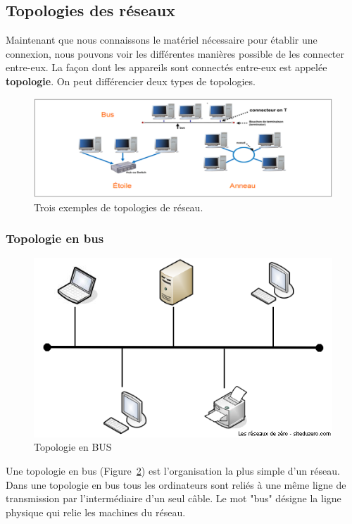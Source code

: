\subsection{Topologies des réseaux}
Maintenant que nous connaissons le matériel nécessaire pour établir une connexion, nous pouvons voir les différentes manières possible de les connecter entre-eux. La façon dont les appareils sont connectés entre-eux est appelée \textbf{topologie}. On peut différencier deux types de topologies.



\begin{figure}[h!t]
  \centering
  \includegraphics[width=.7\textwidth]{images/topologies/reseau_topologies}
  \caption{Trois exemples de topologies de réseau.}
  \label{fig:res_topo}
\end{figure}
\subsubsection{Topologie en bus}
\begin{figure}[h!]
  \centering
  \includegraphics[width=.4\textwidth]{images/topologies/topologieBus}
  \caption{Topologie en BUS}
  \label{fig:topoBus}
\end{figure}
Une topologie en bus (Figure~\ref{fig:topoBus}) est l'organisation la plus simple d'un réseau. Dans une topologie en bus tous les ordinateurs sont reliés à une même ligne de transmission par l'intermédiaire d'un seul câble. Le mot "bus" désigne la ligne physique qui relie les machines du réseau.

